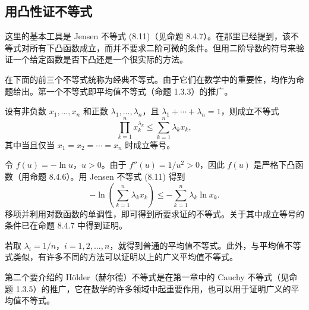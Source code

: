 \subsection{用凸性证不等式}

这里的基本工具是 Jensen 不等式 (8.11)（见命题 8.4.7）。在那里已经提到，该不等式对所有下凸函数成立，而并不要求二阶可微的条件。但用二阶导数的符号来验证一个给定函数是否下凸还是一个很实际的方法。

在下面的前三个不等式统称为经典不等式。由于它们在数学中的重要性，均作为命题给出。第一个不等式即平均值不等式（命题 1.3.3）的推广。

\begin{xtheorem}
设有非负数 $x_1,\ldots,x_n$ 和正数 $\lambda_1,\ldots,\lambda_n$，且 $\lambda_1+\cdots+\lambda_n=1$，则成立不等式
\begin{equation}
  \prod_{k=1}^n x_k^{\lambda_k}\le\sum_{k=1}^n\lambda_kx_k,
  \tag{8.14}
  \label{eq:8.14}
\end{equation}
其中当且仅当 $x_1=x_2=\cdots=x_n$ 时成立等号。
\end{xtheorem}
\begin{xproof}
令 $f(u)=-\ln u$，$u>0$。由于 $f''(u)=1/u^2>0$，因此 $f(u)$ 是严格下凸函数（用命题 8.4.6）。用 Jensen 不等式 (8.11) 得到
\[
  -\ln\left(\sum_{k=1}^n\lambda_kx_k\right)
  \le-\sum_{k=1}^n\lambda_k\ln x_k.
\]
移项并利用对数函数的单调性，即可得到所要求证的不等式。关于其中成立等号的条件已在命题 8.4.7 中得到证明。
\end{xproof}

\begin{xremark}
若取 $\lambda_i=1/n$，$i=1,2,\ldots,n$，就得到普通的平均值不等式。此外，与平均值不等式类似，有许多不同的方法可以证明以上的广义平均值不等式。
\end{xremark}

第二个要介绍的 Hölder（赫尔德）不等式是在第一章中的 Cauchy 不等式（见命题 1.3.5）的推广，它在数学的许多领域中起重要作用，也可以用于证明广义的平均值不等式。

